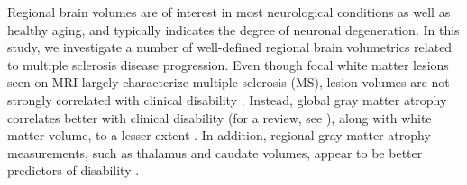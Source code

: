 Regional brain volumes are of interest in most neurological conditions as well as healthy aging, and typically indicates the degree of neuronal degeneration. In this study, we investigate a number of well-defined regional brain volumetrics related to multiple sclerosis disease progression. Even though focal white matter lesions seen on MRI largely characterize multiple sclerosis (MS), lesion volumes are not strongly correlated with clinical disability \cite{lesions1,lesions2,lesions3}. Instead, global gray matter atrophy correlates better with clinical disability (for a review, see \cite{horakova2012clinical}), along with white matter volume, to a lesser extent \cite{white1}. In addition, regional gray matter atrophy measurements, such as thalamus \cite{thal1,thal2,thal3,thal4} and caudate \cite{caud1,caud2} volumes, appear to be better predictors of disability \cite{gm1,gm2,gm3,gm4}.   %